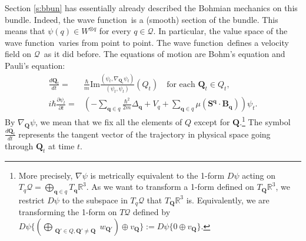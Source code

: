 \documentclass[11pt]{article}
\theoremstyle{remark}
\begin{document}
Section {\ref{s:bbun}} has essentially already described the 
Bohmian mechanics on this bundle. Indeed, the wave function\ is a
(smooth) section
of the bundle. This  means that $\ensuremath{\psi}( \ensuremath{q}) \in \ensuremath{{\ensuremath{W}}^{{\otimes}{\ensuremath{q}}}}$ for
every $\ensuremath{q} \in \ensuremath{\mathcal{Q}}$. In particular, the value space of the wave function\
varies from point to point. 
The wave function\ defines a velocity field on
\ensuremath{\mathcal{Q}}\ as it did before. The equations
of motion are Bohm's equation and Pauli's equation:
\begin{subequations}
\begin{align} 
\ensuremath{\frac{d{\boldsymbol{Q}_t}}{d{t}}} =&  \ensuremath{\frac{\hbar}{m_{}}} \textrm{Im}
\frac {\ensuremath{({\ensuremath{\psi}_t}, {\nabla_{\boldsymbol{Q}_t} \ensuremath{\psi}_t})}}{
\ensuremath{({\ensuremath{\psi}_t}, {\ensuremath{\psi}_t})}} (Q_t)
  \quad \text{for each $\boldsymbol{Q}_t \in Q_t$,} \label{e:natbohm}\\  
i \hbar \ensuremath{\frac{\partial {\ensuremath{\psi}_t}}{\partial {t}}} =& (\ensuremath{ - \sum_{ \ensuremath{\boldsymbol{q}} \in \ensuremath{q}}
\ensuremath{\frac{\hbar^2}{2m_{}}} \ensuremath{\Delta}_{\ensuremath{\boldsymbol{q}}}  + V_{\ensuremath{q}} + \sum_{\ensuremath{\boldsymbol{q}} \in \ensuremath{q}}
\ensuremath{\ensuremath{\mu}(\ensuremath{\boldsymbol{S}}^{\ensuremath{\boldsymbol{q}}} \cdot
\boldsymbol{B}_{{\ensuremath{\boldsymbol{q}}}})}}) \ensuremath{\psi}_t \label{e:natschr}.
\end{align}
\end{subequations}
By $\nabla_{\boldsymbol{Q}} \ensuremath{\psi}$, we mean that we fix all the elements of
$Q$ except for $\boldsymbol{Q}$.\footnote{More precisely, $\nabla \ensuremath{\psi}$ is
metrically equivalent to the
1-form $D \ensuremath{\psi}$ acting on 
$T_{\ensuremath{q}}\ensuremath{\mathcal{Q}} = \bigoplus_{\ensuremath{\boldsymbol{q}} \in \ensuremath{q}} T_{\ensuremath{\boldsymbol{q}}}
\ensuremath{\mathbb{R}^{\ensuremath{3}}}$. 
As we want to transform a 1-form defined on $T_{\boldsymbol{Q}}
\ensuremath{\mathbb{R}^{\ensuremath{3}}}$, we restrict $D \ensuremath{\psi}$ to the subspace in
$T_{\ensuremath{q}}\ensuremath{\mathcal{Q}}$ 
that   $T_{\boldsymbol{Q}}
\ensuremath{\mathbb{R}^{\ensuremath{3}}}$ is. Equivalently, we are transforming the 1-form
on $T\ensuremath{\mathcal{Q}}$ defined by
\mbox{$D\ensuremath{\psi} \{ (\bigoplus_{\substack{\boldsymbol{Q}' \in Q, 
\boldsymbol{Q}' \neq  \boldsymbol{Q}}} w_{\boldsymbol{Q}'}) \oplus
v_{\boldsymbol{Q}} \}\ensuremath{:=} D\ensuremath{\psi}  
\{0 \oplus
v_{\boldsymbol{Q}} \}$.}
}
The symbol
$\ensuremath{\frac{d{\boldsymbol{Q}_t}}{d{t}}}$ represents  the tangent vector of the
trajectory in physical 
space going through $\boldsymbol{Q}_t$ at time $t$. 
\end{document}
